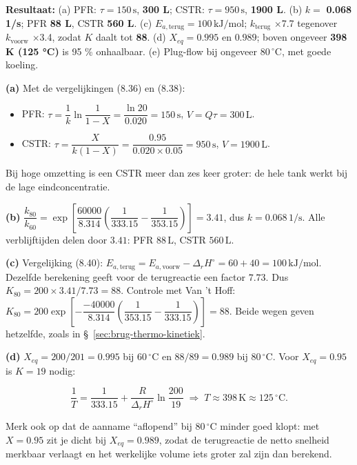\begin{oplossing}
\textbf{Resultaat:} (a) PFR: \(\tau = 150\,\mathrm{s}\), \textbf{300 L}; CSTR: \(\tau = 950\,\mathrm{s}\), \textbf{1900 L}. (b) \(k =\) \textbf{0.068 1/s}; PFR \textbf{88 L}, CSTR \textbf{560 L}. (c) \(E_{a,\text{terug}} = 100\,\mathrm{kJ/mol}\); \(k_{\text{terug}}\) \ensuremath{\times{}}7.7 tegenover \(k_{\text{voorw}}\) \ensuremath{\times{}}3.4, zodat \(K\) daalt tot \textbf{88}. (d) \(X_{eq} = 0.995\) en \(0.989\); boven ongeveer \textbf{398 K (125 °C)} is 95 \% onhaalbaar. (e) Plug-flow bij ongeveer \(80\,^\circ\mathrm{C}\), met goede koeling.

\textbf{(a)} Met de vergelijkingen (8.36) en (8.38):

\begin{itemize}
\item
  PFR: \(\tau = \dfrac{1}{k}\ln\dfrac{1}{1 - X} = \dfrac{\ln 20}{0.020} = 150\,\mathrm{s}\), \(V = Q\tau = 300\,\mathrm{L}\).
\item
  CSTR: \(\tau = \dfrac{X}{k(1 - X)} = \dfrac{0.95}{0.020 \times 0.05} = 950\,\mathrm{s}\), \(V = 1900\,\mathrm{L}\).
\end{itemize}

Bij hoge omzetting is een CSTR meer dan zes keer groter: de hele tank werkt bij de lage eindconcentratie.

\textbf{(b)} \(\dfrac{k_{80}}{k_{60}} = \exp\!\left[\dfrac{60000}{8.314}\left(\dfrac{1}{333.15} - \dfrac{1}{353.15}\right)\right] = 3.41\), dus \(k = 0.068\,\mathrm{1/s}\). Alle verblijftijden delen door \(3.41\): PFR \(88\,\mathrm{L}\), CSTR \(560\,\mathrm{L}\).

\textbf{(c)} Vergelijking (8.40): \(E_{a,\text{terug}} = E_{a,\text{voorw}} - \Delta_rH^\circ = 60 + 40 = 100\,\mathrm{kJ/mol}\). Dezelfde berekening geeft voor de terugreactie een factor \(7.73\). Dus \(K_{80} = 200 \times 3.41/7.73 = 88\). Controle met Van 't Hoff: \(K_{80} = 200\exp\!\left[-\dfrac{-40000}{8.314}\left(\dfrac{1}{353.15} - \dfrac{1}{333.15}\right)\right] = 88\). Beide wegen geven hetzelfde, zoals in \S~\ref{sec:brug-thermo-kinetiek}.

\textbf{(d)} \(X_{eq} = 200/201 = 0.995\) bij \(60\,^\circ\mathrm{C}\) en \(88/89 = 0.989\) bij \(80\,^\circ\mathrm{C}\). Voor \(X_{eq} = 0.95\) is \(K = 19\) nodig:

\[
\frac{1}{T} = \frac{1}{333.15} + \frac{R}{\Delta_rH^\circ}\ln\frac{200}{19} \;\Rightarrow\; T \approx 398\,\mathrm{K} \approx 125\,^\circ\mathrm{C}.
\]

Merk ook op dat de aanname ``aflopend'' bij \(80\,^\circ\mathrm{C}\) minder goed klopt: met \(X = 0.95\) zit je dicht bij \(X_{eq} = 0.989\), zodat de terugreactie de netto snelheid merkbaar verlaagt en het werkelijke volume iets groter zal zijn dan berekend.


\end{oplossing}
